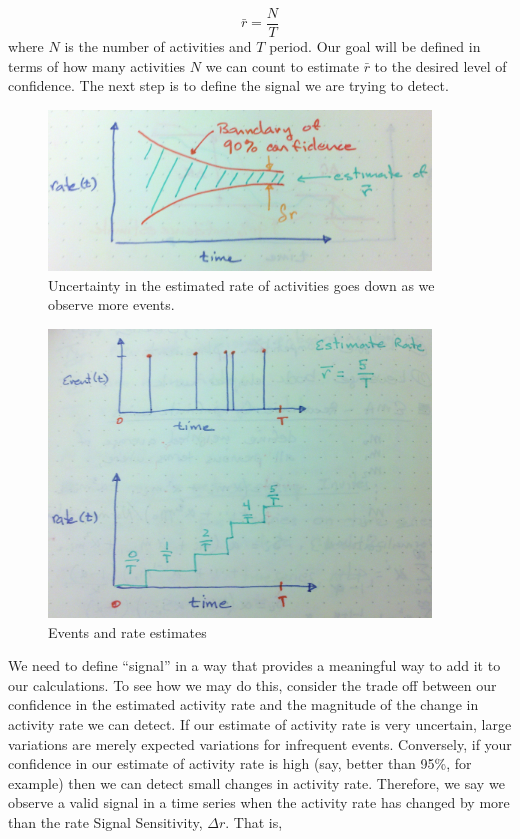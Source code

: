 \documentclass{article}
\begin{document}
\begin{equation}
    \label{eq:rateEst}
    \bar{r} = \frac{N}{T}
\end{equation}
where $N$ is the number of activities and $T$ period.  Our goal will be defined in terms of how many activities $N$ we can count to estimate $\bar{r}$ to the desired level of confidence. The next step is to define the signal we are trying to detect.

%
\begin{figure}[h]
	\begin{center}
		\includegraphics[width=4.0in]{./imgs/confidence.jpg}
	\end{center}
	\caption{Uncertainty in the estimated rate of activities goes down as we observe more events. }
    	\label{fig:confidence}
\end{figure}
%
%


%
\begin{figure}[h]
    \centering
    \includegraphics[width=4.0in]{./imgs/events.jpg}
    \caption{Events and rate estimates}
    \label{fig:events}
\end{figure}
%
%

We need to define ``signal'' in a way that provides a meaningful way to add it to our calculations.  To see how we may do this, consider the trade off between our confidence in the estimated activity rate and the magnitude of the change in activity rate we can detect.  If our estimate of activity rate is very uncertain, large variations are merely expected variations for infrequent events.  Conversely, if your confidence in our estimate of activity rate is high (say, better than 95\%, for example) then we can detect small changes in activity rate.  Therefore, we say we observe a valid signal in a time series when the activity rate has changed by more than the rate Signal Sensitivity, $\Delta r$.  That is,
\end{document}

